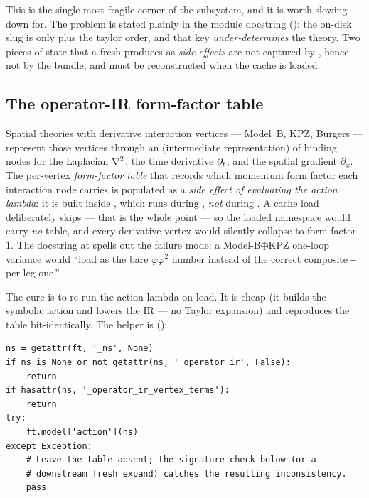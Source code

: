 This is the single most fragile corner of the subsystem, and it is worth slowing
down for. The problem is stated plainly in the module docstring
(): the on-disk slug is only
 plus the taylor order, and that key \emph{under-determines}
the theory. Two pieces of state that a fresh  produces as
\emph{side effects} are not captured by , hence not by the
bundle, and must be reconstructed when the cache is loaded.

\subsection{The operator-IR form-factor table}

Spatial theories with derivative interaction vertices --- Model~B, KPZ, Burgers
--- represent those vertices through an  (intermediate
representation) of binding nodes for the Laplacian $\nabla^2$, the time derivative
$\partial_t$, and the spatial gradient $\partial_x$. The per-vertex \emph{form-factor
table} that records which momentum form factor each interaction node carries is
populated as a \emph{side effect of evaluating the action lambda}: it is built
inside , which runs during
, \emph{not} during . A
cache load deliberately skips  --- that is the whole point --- so
the loaded namespace would carry \emph{no} table, and every derivative vertex
would silently collapse to form factor $1$. The docstring at
 spells out the failure mode: a
Model-B$\oplus$KPZ one-loop variance would ``load as the bare $\tilde\varphi
\varphi^2$ number instead of the correct composite\,+\,per-leg one.''

The cure is to re-run the action lambda on load. It is cheap (it builds the
symbolic action and lowers the IR --- no Taylor expansion) and reproduces the
table bit-identically. The helper is 
():

\begin{lstlisting}
ns = getattr(ft, '_ns', None)
if ns is None or not getattr(ns, '_operator_ir', False):
    return
if hasattr(ns, '_operator_ir_vertex_terms'):
    return
try:
    ft.model['action'](ns)
except Exception:
    # Leave the table absent; the signature check below (or a
    # downstream fresh expand) catches the resulting inconsistency.
    pass
\end{lstlisting}

